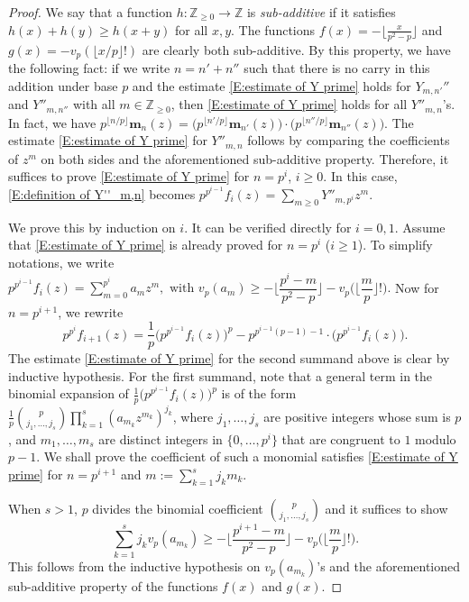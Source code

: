 \documentclass[12pt]{amsart}
\theoremstyle{definition}
\numberwithin{equation}{subsection}
\def\ZZ{\mathbb{Z}}
\def\bfm{\mathbf{m}}
\begin{document}
\begin{proof}
We say that a function $h:\ZZ_{ \geq 0}\rightarrow \ZZ$ is \emph{sub-additive} if it satisfies $h(x)+h(y)\geq h(x+y)$ for all $x,y$. The functions $f(x)=-\lfloor \frac{x}{p^2-p}\rfloor$ and $g(x)=-v_p(\lfloor x/p\rfloor!) $ are clearly both sub-additive. By this property, we have the following fact: if we write $n=n'+n''$ such that there is no carry in this addition under base $p$ and the estimate \eqref{E:estimate of Y prime} holds for $Y_{m,n'}''$ and $Y''_{m,n''}$ with all $m \in \ZZ_{\geq 0}$, then \eqref{E:estimate of Y prime} holds for all $Y''_{m,n}$'s. In fact, we have $p^{\lfloor n/p\rfloor }\bfm_n(z)=\big( p^{\lfloor n'/p\rfloor }\bfm_{n'}(z)\big)\cdot \big(p^{\lfloor n''/p\rfloor }\bfm_{n''}(z) \big)$. The estimate \eqref{E:estimate of Y prime} for $Y''_{m,n}$ follows by comparing the coefficients of $z^m$ on both sides and the aforementioned sub-additive property. Therefore, it suffices to prove \eqref{E:estimate of Y prime} for $n=p^i$, $i\geq 0$. In this case, \eqref{E:definition of Y''_m,n} becomes $p^{p^{i-1}}f_i(z)=\sum\limits_{m\geq 0}Y''_{m,p^i}z^m$. 

We prove this by induction on $i$. It can be verified directly for $i=0,1$. Assume that \eqref{E:estimate of Y prime} is already proved for $n =p^i$ ($i \geq 1$). To simplify notations, we write 
$
p^{p^{i-1}}f_i(z)=\sum\limits_{m=0}^{p^i}a_mz^m, \text{~with~}v_p(a_m)\geq -\Big\lfloor \dfrac{p^i-m}{p^2-p} \Big\rfloor-v_p\Big( \Big\lfloor \dfrac mp \Big\rfloor!\Big).
$
Now for $n=p^{i+1}$, we rewrite 
$$
p^{p^i} f_{i+1}(z) = \frac 1p \big( p^{p^{i-1}}f_i(z)\big)^p - p^{p^{i-1}(p-1)-1} \cdot \big(p^{p^{i-1}} f_i(z) \big).
$$
The estimate \eqref{E:estimate of Y prime} for the second summand above is clear by inductive hypothesis.  For the first summand, note that a general term in the binomial expansion of $\frac 1p \big( p^{p^{i-1}}f_i(z) \big)^p$ is of the form $\frac 1p \binom{p}{j_1,\dots, j_s}\prod\limits_{k=1}^s(a_{m_k}z^{m_k})^{j_k}$, where $j_1,\dots, j_s$ are positive integers whose sum is $p$, and $m_1,\dots, m_s$ are distinct integers in $\{0,\dots, p^i \}$ that are congruent to $1$ modulo $p-1$. We shall prove the coefficient of such a monomial satisfies \eqref{E:estimate of Y prime} for $n=p^{i+1}$ and $m:=\sum\limits_{k=1}^s j_km_k$.

When $s>1$, $p$ divides the binomial coefficient $\binom{p}{j_1,\dots, j_s}$ and it suffices to show
\[
\sum_{k=1}^sj_kv_p(a_{m_k})\geq -\Big\lfloor \frac{p^{i+1}-m}{p^2-p}\Big\rfloor -v_p\Big(\Big\lfloor \frac mp\Big\rfloor ! \Big).
\]
This follows from the inductive hypothesis on $v_p(a_{m_k})$'s and the aforementioned sub-additive property of the functions $f(x)$ and $g(x)$.


\end{proof}
\end{document}
